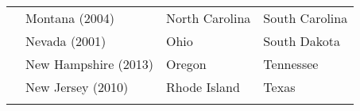 \documentclass[11pt,]{article}
\begin{document}
\begin{longtable}[]{@{}llll@{}}
\begin{minipage}[t]{0.20\columnwidth}
\strut
\end{minipage} & \begin{minipage}[t]{0.26\columnwidth}\raggedright
Montana (2004)\strut
\end{minipage} & \begin{minipage}[t]{0.24\columnwidth}\raggedright
North Carolina\strut
\end{minipage} & \begin{minipage}[t]{0.19\columnwidth}\raggedright
South Carolina\strut
\end{minipage}\tabularnewline
\begin{minipage}[t]{0.20\columnwidth}\raggedright
\strut
\end{minipage} & \begin{minipage}[t]{0.26\columnwidth}\raggedright
Nevada (2001)\strut
\end{minipage} & \begin{minipage}[t]{0.24\columnwidth}\raggedright
Ohio\strut
\end{minipage} & \begin{minipage}[t]{0.19\columnwidth}\raggedright
South Dakota\strut
\end{minipage}\tabularnewline
\begin{minipage}[t]{0.20\columnwidth}\raggedright
\strut
\end{minipage} & \begin{minipage}[t]{0.26\columnwidth}\raggedright
New Hampshire (2013)\strut
\end{minipage} & \begin{minipage}[t]{0.24\columnwidth}\raggedright
Oregon\strut
\end{minipage} & \begin{minipage}[t]{0.19\columnwidth}\raggedright
Tennessee\strut
\end{minipage}\tabularnewline
\begin{minipage}[t]{0.20\columnwidth}\raggedright
\strut
\end{minipage} & \begin{minipage}[t]{0.26\columnwidth}\raggedright
New Jersey (2010)\strut
\end{minipage} & \begin{minipage}[t]{0.24\columnwidth}\raggedright
Rhode Island\strut
\end{minipage} & \begin{minipage}[t]{0.19\columnwidth}\raggedright
Texas\strut
\end{minipage}\tabularnewline
\begin{minipage}[t]{0.20\columnwidth}\raggedright

\end{minipage}
\end{longtable}
\end{document}
